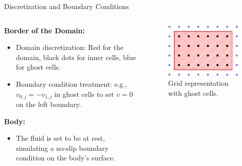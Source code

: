 \begin{frame}{Discretization and Boundary Conditions}

  \begin{columns}
    \begin{column}{0.5\textwidth}
      \textbf{Border of the Domain:}
      \begin{itemize}
        \item Domain discretization: Red for the domain, black dots for inner cells, blue for ghost cells.
        \item Boundary condition treatment: e.g., \(v_{0,j} = -v_{1,j}\) in ghost cells to set $v = 0$ on the left boundary.
      \end{itemize}

      \vspace{0.5cm}
      \textbf{Body:}
      \begin{itemize}
        \item The fluid is set to be at rest, simulating a no-slip boundary condition on the body's surface.
      \end{itemize}
    \end{column}
    \begin{column}{0.5\textwidth}
      \begin{figure}
        \centering
        \includegraphics[width=0.7\linewidth]{graphics/grid.pdf}
        \caption{Grid representation with ghost cells.}
      \end{figure}
    \end{column}
  \end{columns}

\end{frame}

